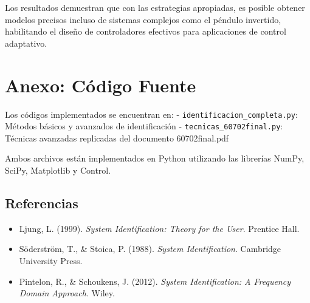 \documentclass[a4paper,openright,9pt]{report}
\newcommand{\code}[1]{\texttt{#1}} %
\begin{document}
Los resultados demuestran que con las estrategias apropiadas, es posible obtener modelos precisos incluso de sistemas complejos como el péndulo invertido, habilitando el diseño de controladores efectivos para aplicaciones de control adaptativo.

\section{Anexo: Código Fuente}

Los códigos implementados se encuentran en:
- \code{identificacion_completa.py}: Métodos básicos y avanzados de identificación
- \code{tecnicas_60702final.py}: Técnicas avanzadas replicadas del documento 60702final.pdf

Ambos archivos están implementados en Python utilizando las librerías NumPy, SciPy, Matplotlib y Control.

\subsection{Referencias}

\begin{itemize}
\item Ljung, L. (1999). \textit{System Identification: Theory for the User}. Prentice Hall.
\item Söderström, T., \& Stoica, P. (1988). \textit{System Identification}. Cambridge University Press.
\item Pintelon, R., \& Schoukens, J. (2012). \textit{System Identification: A Frequency Domain Approach}. Wiley.
\end{itemize}
\end{document}
